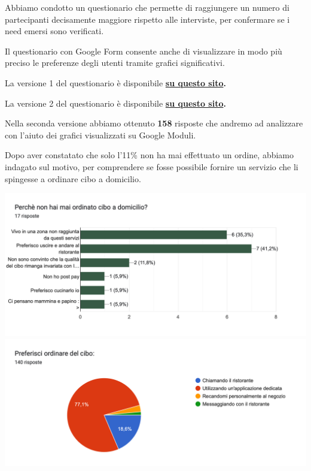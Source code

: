 \documentclass{article}
\begin{document}
\newpage
\vspace{2cm} \par 
{}\vspace{0.5cm}
\par Abbiamo condotto un questionario che permette di raggiungere un numero di partecipanti decisamente maggiore rispetto alle interviste, per confermare se i need emersi sono verificati.\par Il questionario con Google Form consente anche di visualizzare in modo più preciso le preferenze degli utenti tramite grafici significativi.
\par La versione 1 del questionario è disponibile \textbf{\href{https://forms.gle/pBWCBfAxsjULCZRj6}{su questo sito}.}
\par La versione 2 del questionario è disponibile \textbf{\href{https://docs.google.com/forms/d/1ToAwRVi9a8q0_68hbEI7O8ORtodt_uTHuwU9ZtPfk1Q/edit}{su questo sito}.}
\par \vspace{1cm}
Nella seconda versione abbiamo ottenuto \textbf{158} risposte che andremo ad analizzare con l'aiuto dei grafici visualizzati su Google Moduli.\par \vspace{1cm}
\par Dopo aver constatato che solo l'11\% non ha mai effettuato un ordine, abbiamo indagato sul motivo, per comprendere se fosse possibile fornire un servizio che li spingesse a ordinare cibo a domicilio.
\vspace{0.5cm}
\par 
\includegraphics[width=\textwidth]{Data/Grafici/Perche_non_ordina.png}
\includegraphics[width=\textwidth]{Data/Grafici/ordinare_cibo.png}
\end{document}
